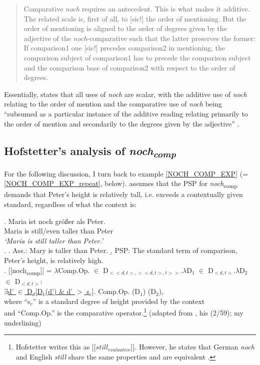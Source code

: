 \documentclass[output=paper,
modfonts
]{langscibook}
\begin{document}
    \begin{quote}
    Comparative \textit{noch} requires an antecedent. This is what makes it additive. The related scale is, first of all, to [sic!] the order of mentioning. But the order of mentioning is aligned to the order of degrees given by the adjective of the \textit{noch}-comparative such that the latter preserves the former: If comparison1 one [sic!] precedes comparison2 in mentioning, the comparison subject of comparison1 has to precede the comparison subject and the comparison base of comparison2 with respect to the order of degrees. \citep[p.13]{umbach2009a_comp}
    \end{quote}


\noindent Essentially, \citeauthor{umbach2009a_comp} states that all uses of \textit{noch} are scalar, with the additive use of \textit{noch} relating to the order of mention and the comparative use of \textit{noch} being ``subsumed as a particular instance of the additive reading relating primarily to the order of mention and secondarily to the degrees given by the adjective'' \citep[p.14]{umbach2009a_comp}.

\subsection{Hofstetter's \citeyearpar{Hofstetter2013} analysis of \textit{noch\textsubscript{comp}}}

For the following discussion, I turn back to example \ref{NOCH_COMP_EXP} (= \ref{NOCH_COMP_EXP_repeat}, below). \citet{Hofstetter2013} assumes that the PSP for \textit{noch}\textsubscript{comp} demands that Peter's height is relatively tall, i.e. exceeds a contextually given standard, regardless of what the context is:

\exg. Maria ist noch größer als Peter.\\
Maria is still/even taller than Peter\\
\textit{`Maria is still taller than Peter.'} \label{NOCH_COMP_EXP_repeat}\\

\ex. \label{NOCH_COMP_meaning_components} \a. Ass.: Mary is taller than Peter.
\b. PSP: The standard term of comparison, Peter's height, is relatively high.\label{NOCH_COMP_PSP_00} \\

\ex. [[noch\textsubscript{comp}]] = $\lambda$Comp.Op. $\in$ D$_{<<d,t>,<<d,t>,t>>}$.$\lambda$D$_1$ $\in$ D$_{<d,t>}$.$\lambda$D$_2$ $\in$ D$_{<d,t>}$: \\\underline{$\exists$d' $\in$ D$_d$[D$_1$(d') \& d' $>$ s$_c$}]. Comp.Op. (D$_1$) (D$_2$),\\ where ``s$_c$'' is a standard degree of height provided by the context \\and ``Comp.Op.'' is the comparative operator.\footnote{ Hofstetter writes this as [[$still_{evaluative}$]]. However, he states that German \textit{noch} and English \textit{still} share the same properties and are equivalent \citep[31]{Hofstetter2013}.} \label{HS_entry_comp} 
\flushright\vspace{-9pt} (adapted from \citeauthor{Hofstetter2013} \citeyearpar{Hofstetter2013}, his (2/59); my underlining)
\end{document}

